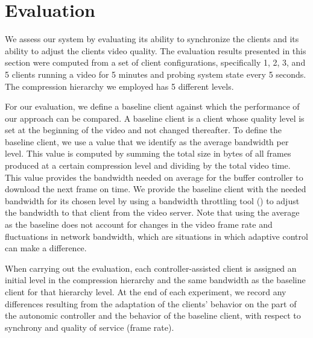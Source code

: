 \documentclass{sig-alternate}
\begin{document}
\section{Evaluation} \label{eval}

We assess our system by evaluating its ability to synchronize the
clients and its ability to adjust the clients video quality.  The
evaluation results presented in this section were computed from a set
of client configurations, specifically 1, 2, 3, and 5 clients running
a video for 5 minutes and probing system state every 5 seconds. The
compression hierarchy we employed has 5 different levels.

For our evaluation, we define a baseline client against which the
performance of our approach can be compared.  A baseline client is a
client whose quality level is set at the beginning of the video and
not changed thereafter.  To define the baseline client, we use a value
that we identify as the average bandwidth per level. This value is
computed by summing the total size in bytes of all frames produced at
a certain compression level and dividing by the total video time.
This value provides the bandwidth needed on average for the buffer
controller to download the next frame on time.  We provide the
baseline client with the needed bandwidth for its chosen level by
using a bandwidth throttling tool (\cite{SHAPERD}) to adjust the
bandwidth to that client from the video server.  Note that using the
average as the baseline does not account for changes in the video
frame rate and fluctuations in network bandwidth, which are situations
in which adaptive control can make a difference.

When carrying out the evaluation, each controller-assisted client is
assigned an initial level in the compression hierarchy and the same
bandwidth as the baseline client for that hierarchy level.  At the end
of each experiment, we record any differences resulting from the
adaptation of the clients' behavior on the part of the autonomic
controller and the behavior of the baseline client, with respect to
synchrony and quality of service (frame rate).

 
\end{document}
